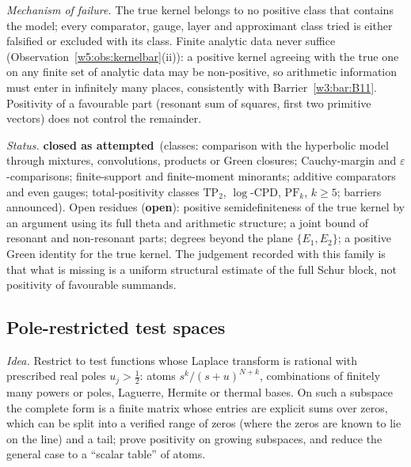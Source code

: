 \documentclass[11pt]{amsart}
\theoremstyle{definition}
\theoremstyle{remark}
\numberwithin{equation}{section}
\newcommand{\rtag}[1]{\textbf{\small\textsf{#1}}}
\newcommand{\closedA}{\rtag{closed as attempted}}
\newcommand{\openR}{\rtag{open}}
\newcommand{\entry}[1]{\par\smallskip\noindent\textit{#1.}\enspace}
\begin{document}
\entry{Mechanism of failure} The true kernel belongs to no positive class that contains the model; every comparator, gauge,
layer and approximant class tried is either falsified or excluded with its class. Finite analytic data never suffice
(Observation~\ref{w5:obs:kernelbar}(ii)): a positive kernel agreeing with the true one on any finite set of analytic data may
be non-positive, so arithmetic information must enter in infinitely many places, consistently with Barrier~\ref{w3:bar:B11}.
Positivity of a favourable part (resonant sum of squares, first two primitive vectors) does not control the remainder.

\entry{Status} \closedA\ (classes: comparison with the hyperbolic model through mixtures, convolutions, products or Green
closures; Cauchy-margin and $\varepsilon$-comparisons; finite-support and finite-moment minorants; additive comparators and
even gauges; total-positivity classes $\mathrm{TP}_2$, $\log$-CPD, $\mathrm{PF}_k$, $k\ge5$; barriers announced). Open residues
(\openR): positive semidefiniteness of the true kernel by an argument using its full theta and arithmetic structure; a
joint bound of resonant and non-resonant parts; degrees beyond the plane $\{E_1,E_2\}$; a positive Green identity for the
true kernel. The judgement recorded with this family is that what is missing is a uniform structural estimate of the full
Schur block, not positivity of favourable summands.

\subsection{Pole-restricted test spaces}\label{w5:subsec:power}

\entry{Idea} Restrict to test functions whose Laplace transform is rational with prescribed real poles $u_j>\frac12$:
atoms $s^k/(s+u)^{N+k}$, combinations of finitely many powers or poles, Laguerre, Hermite or thermal bases. On such a
subspace the complete form is a finite matrix whose entries are explicit sums over zeros, which can be split into a
verified range of zeros (where the zeros are known to lie on the line) and a tail; prove positivity on growing subspaces,
and reduce the general case to a ``scalar table'' of atoms.
\end{document}
